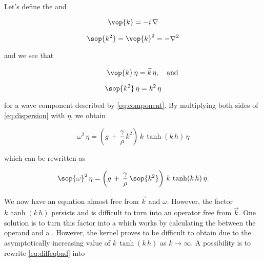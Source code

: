 Let's define the  and 

\begin{samepage}
\begin{equation} \label{eq:opkvec}
\vop{k} = -i\,\nabla
\end{equation}

\begin{equation} \label{eq:opk2}
\sop{k^2} = \vop{k}^2 = -\nabla^2
\end{equation}
\end{samepage}

and we see that 

\begin{samepage}
\begin{equation} \label{eq:opkvec1action}
\phantom{and}\quad\vop{k}\,\eta = \vec{k}\,\eta,\quad\text{and}
\end{equation}

\begin{equation} \label{eq:opk2action}
\sop{k^2}\,\eta = k^2\,\eta
\end{equation}
\end{samepage}

for a wave component described by \eqref{eq:component}. By multiplying both sides of \eqref{eq:dispersion} with $\eta$, we obtain

\begin{equation}
\omega^2\,\eta = \left(g\,+\,\frac{\gamma}{\rho}\,k^2\right)\,k\,\tanh(k\,h)\,\eta
\end{equation}

which can be rewritten as

\begin{equation} \label{eq:diffeqbad}
\sop{\omega}^2\,\eta = \left(g\,+\,\frac{\gamma}{\rho}\,\sop{k^2}\right)\,k\,\tanh(k\,h)\,\eta.
\end{equation}

We now have an equation almost free from $\vec{k}$ and $\omega$. However, the factor $k\,\tanh(k\,h)$ persists and is difficult to turn into an operator free from $\vec{k}$. One solution is to turn this factor into a  which works by calculating the  between the operand and a . However, the kernel proves to be difficult to obtain due to the asymptotically increasing value of $k\,\tanh(k\,h)$ as $k\rightarrow\infty$. A possibility is to rewrite \eqref{eq:diffeqbad} into


